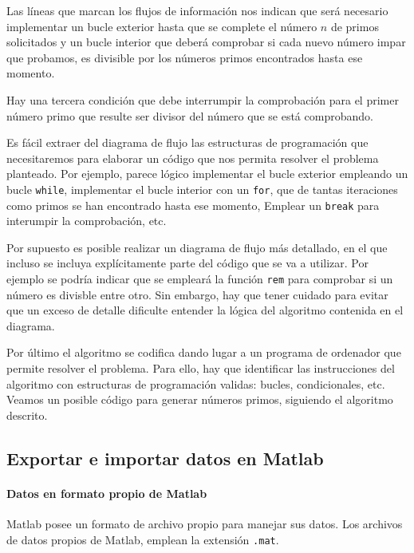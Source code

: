 Las líneas que marcan los flujos de información nos indican que será necesario implementar un bucle exterior hasta que se complete el número $n$ de primos solicitados y un bucle interior que deberá comprobar si cada nuevo número impar que probamos, es divisible por los números primos encontrados hasta ese momento.

Hay una tercera condición que debe interrumpir la comprobación para el primer número primo que resulte ser divisor del número que se está comprobando.

Es fácil extraer del diagrama de flujo las estructuras de programación que necesitaremos para elaborar un código que nos permita resolver el problema planteado. Por ejemplo, parece lógico implementar el bucle exterior empleando un bucle \texttt{while}, implementar el bucle interior con un \texttt{for}, que de tantas iteraciones como primos se han encontrado hasta ese momento, Emplear un \texttt{break} para interumpir la comprobación, etc.

Por supuesto es posible realizar un diagrama de flujo más detallado, en el que incluso se incluya explícitamente parte del código que se va a utilizar. Por ejemplo se podría indicar que se empleará la función \texttt{rem} para comprobar si un número es divisble entre otro. Sin embargo, hay que tener cuidado para evitar que un exceso de detalle dificulte entender la lógica del algoritmo contenida en el diagrama.

Por último el algoritmo se codifica dando lugar a un programa de ordenador que permite resolver el problema. Para ello, hay que identificar las instrucciones del algoritmo con estructuras de programación validas: bucles, condicionales, etc. Veamos un posible código para generar números primos, siguiendo el algoritmo descrito. 
 
% 

\subsection{Exportar e importar datos en Matlab} \label{fpf}

\paragraph*{Datos en formato propio de Matlab}
Matlab posee un formato de archivo propio para manejar sus datos. Los archivos de datos propios de Matlab, emplean la extensión \texttt{.mat}.



